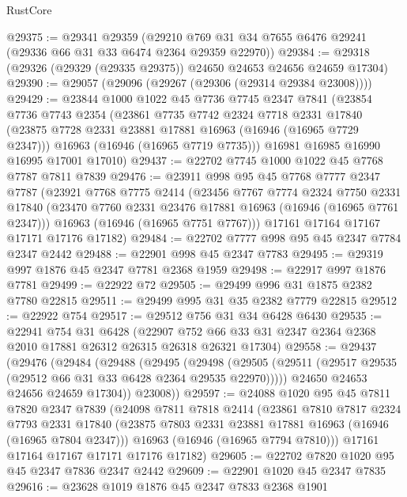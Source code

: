 \begin{lexlean}{RustCore}
\begin{coremodule}
@29375 := @29341
    @29359
    (@29210 @769 @31 @34 @7655 @6476 @29241 (@29336 @66 @31 @33 @6474 @2364 @29359 @22970))
@29384 := @29318 (@29326 (@29329 (@29335 @29375)) @24650 @24653 @24656 @24659 @17304)
@29390 := @29057 (@29096 (@29267 (@29306 (@29314 @29384 @23008))))
@29429 := @23844
    @1000
    @1022
    @45
    @7736
    @7745
    @2347
    @7841
    (@23854
      @7736
      @7743
      @2354
      (@23861
        @7735
        @7742
        @2324
        @7718
        @2331
        @17840
        (@23875 @7728 @2331 @23881 @17881 @16963 (@16946 (@16965 @7729 @2347)))
        @16963
        (@16946 (@16965 @7719 @7735)))
      @16981
      @16985
      @16990
      @16995
      @17001
      @17010)
@29437 := @22702 @7745 @1000 @1022 @45 @7768 @7787 @7811 @7839
@29476 := @23911
    @998
    @95
    @45
    @7768
    @7777
    @2347
    @7787
    (@23921
      @7768
      @7775
      @2414
      (@23456
        @7767
        @7774
        @2324
        @7750
        @2331
        @17840
        (@23470 @7760 @2331 @23476 @17881 @16963 (@16946 (@16965 @7761 @2347)))
        @16963
        (@16946 (@16965 @7751 @7767)))
      @17161
      @17164
      @17167
      @17171
      @17176
      @17182)
@29484 := @22702 @7777 @998 @95 @45 @2347 @7784 @2347 @2442
@29488 := @22901 @998 @45 @2347 @7783
@29495 := @29319 @997 @1876 @45 @2347 @7781 @2368 @1959
@29498 := @22917 @997 @1876 @7781
@29499 := @22922 @72
@29505 := @29499 @996 @31 @1875 @2382 @7780 @22815
@29511 := @29499 @995 @31 @35 @2382 @7779 @22815
@29512 := @22922 @754
@29517 := @29512 @756 @31 @34 @6428 @6430
@29535 := @22941
    @754
    @31
    @6428
    (@22907 @752 @66 @33 @31 @2347 @2364 @2368 @2010 @17881 @26312 @26315 @26318 @26321 @17304)
@29558 := @29437
    (@29476
      (@29484
        (@29488
          (@29495
            (@29498
              (@29505 (@29511 (@29517 @29535 (@29512 @66 @31 @33 @6428 @2364 @29535 @22970)))))
            @24650
            @24653
            @24656
            @24659
            @17304))
        @23008))
@29597 := @24088
    @1020
    @95
    @45
    @7811
    @7820
    @2347
    @7839
    (@24098
      @7811
      @7818
      @2414
      (@23861
        @7810
        @7817
        @2324
        @7793
        @2331
        @17840
        (@23875 @7803 @2331 @23881 @17881 @16963 (@16946 (@16965 @7804 @2347)))
        @16963
        (@16946 (@16965 @7794 @7810)))
      @17161
      @17164
      @17167
      @17171
      @17176
      @17182)
@29605 := @22702 @7820 @1020 @95 @45 @2347 @7836 @2347 @2442
@29609 := @22901 @1020 @45 @2347 @7835
@29616 := @23628 @1019 @1876 @45 @2347 @7833 @2368 @1901

\end{coremodule}
\end{lexlean}

